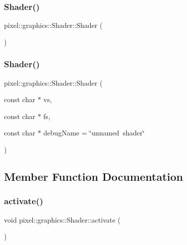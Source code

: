 \subsubsection{\texorpdfstring{Shader()}{Shader()}\hspace{0.1cm}{\footnotesize\ttfamily [1/2]}}
{\footnotesize\ttfamily pixel\+::graphics\+::\+Shader\+::\+Shader (\begin{DoxyParamCaption}{ }\end{DoxyParamCaption})\hspace{0.3cm}{\ttfamily [default]}}

\mbox{\label{classpixel_1_1graphics_1_1_shader_a24d7d729d986f748733ad2f9fc66a7e5}} 
\subsubsection{\texorpdfstring{Shader()}{Shader()}\hspace{0.1cm}{\footnotesize\ttfamily [2/2]}}
{\footnotesize\ttfamily pixel\+::graphics\+::\+Shader\+::\+Shader (\begin{DoxyParamCaption}\item[{const char $\ast$}]{vs,  }\item[{const char $\ast$}]{fs,  }\item[{const char $\ast$}]{debug\+Name = {\ttfamily \char`\"{}unnamed~shader\char`\"{}} }\end{DoxyParamCaption})}



\subsection{Member Function Documentation}
\mbox{\label{classpixel_1_1graphics_1_1_shader_a27aec380b1a925e6a5b792fd65dbec81}} 
\subsubsection{\texorpdfstring{activate()}{activate()}}
{\footnotesize\ttfamily void pixel\+::graphics\+::\+Shader\+::activate (\begin{DoxyParamCaption}{ }\end{DoxyParamCaption})}


